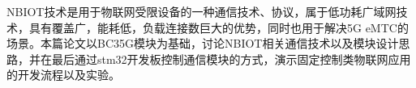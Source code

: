 	
\begin{chineseabstract}

NBIOT技术是用于物联网受限设备的一种通信技术、协议，属于低功耗广域网技术，具有覆盖广，能耗低，负载连接数巨大的优势，同时也用于解决5G eMTC的场景。本篇论文以BC35G模块为基础，讨论NBIOT相关通信技术以及模块设计思路，并在最后通过stm32开发板控制通信模块的方式，演示固定控制类物联网应用的开发流程以及实验。

\end{chineseabstract}

